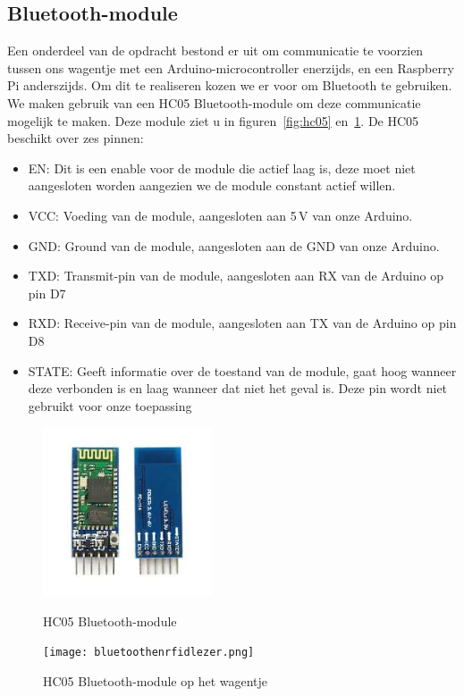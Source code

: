 \subsection{Bluetooth-module}
Een onderdeel van de opdracht bestond er uit om communicatie te voorzien tussen ons wagentje met een Arduino-microcontroller enerzijds, en een Raspberry Pi anderszijds. Om dit te realiseren kozen we er voor om Bluetooth te gebruiken.
We maken gebruik van een HC05 Bluetooth-module om deze communicatie mogelijk te maken.
Deze module ziet u in figuren~\ref{fig:hc05} en~\ref{fig:hc05montage}. De HC05 beschikt over zes pinnen:
\begin{itemize}
	\item EN: Dit is een enable voor de module die actief laag is, deze moet niet aangesloten worden aangezien we de module constant actief willen.
	\item VCC: Voeding van de module, aangesloten aan 5\,V van onze Arduino.
	\item GND: Ground van de module, aangesloten aan de GND van onze Arduino.
	\item TXD: Transmit-pin van de module, aangesloten aan RX van de Arduino op pin D7
	\item RXD: Receive-pin van de module, aangesloten aan TX van de Arduino op pin D8
	\item STATE: Geeft informatie over de toestand van de module, gaat hoog wanneer deze verbonden is en laag wanneer dat niet het geval is. Deze pin wordt niet gebruikt voor onze toepassing
\end{itemize}

\begin{figure}[H]
	\centering
	\begin{minipage}[b]{0.4\textwidth}
		\centering
		\includegraphics[height=5cm]{hc05.png}
		\caption{HC05 Bluetooth-module\label{fig:hc05}}
	\end{minipage}
	\hfill
	\begin{minipage}[b]{0.4\textwidth}
		\centering
		\texttt{[image: bluetoothenrfidlezer.png]}
		\caption{HC05 Bluetooth-module op het wagentje\label{fig:hc05montage}}
	\end{minipage}
\end{figure}

